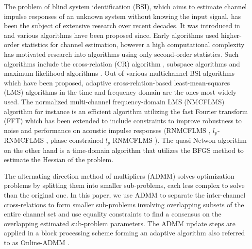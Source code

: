 \documentclass{article}
\begin{document}
The problem of blind system identification (BSI), which aims to estimate channel impulse responses of an unknown system without knowing the input signal, has been the subject of extensive research over recent decades.
It was introduced in \cite{satoMethodSelfRecoveringEqualization1975} and various algorithms have been proposed since.
Early algorithms used higher-order statistics \cite{godardSelfRecoveringEqualizationCarrier1980,tongNewApproachBlind1991,mecidel1991tutorial} for channel estimation, however a high computational complexity has motivated research into algorithms using only second-order statistics.
Such algorithms include the cross-relation (CR) algorithm \cite{tong1994blind, guanghanxuLeastsquaresApproachBlind1995}, subspace algorithms \cite{moulinesSubspaceMethodsBlind1995,gannotSubspaceMethodsMultimicrophone2003,diamantarasEfficientSubspaceMethod2008,mayyalaStructureBasedSubspaceMethod2017} and maximum-likelihood algorithms \cite{yingbohuaFastMaximumLikelihood1996}.
Out of various multichannel BSI algorithms which have been proposed, adaptive cross-relation-based least-mean-squares (LMS) algorithms in the time and frequency domain are the ones most widely used.
The normalized multi-channel frequency-domain LMS (NMCFLMS) \cite{huangAdaptiveMultichannelLeast2002,huangClassFrequencydomainAdaptive2003} algorithm for instance is an efficient algorithm utilizing the fast Fourier transform (FFT) which has been extended to include constraints to improve robustness to noise and performance on acoustic impulse responses (RNMCFLMS \cite{huNoiseRobustBlind2015}, \(l_p\)-RNMCFLMS \cite{heNoiseRobustFrequencyDomain2018}, phase-constrained-\(l_p\)-RNMCFLMS \cite{joRobustBlindMultichannel2021}).
The quasi-Netwon algorithm \cite{habetsOnlineQuasiNewtonAlgorithm2010} on the other hand is a time-domain algorithm that utilizes the BFGS method to estimate the Hessian of the problem.

The alternating direction method of multipliers (ADMM) \cite{boydDistributedOptimizationStatistical2011} solves optimization problems by splitting them into smaller sub-problems, each less complex to solve than the original one.
In this paper, we use ADMM to separate the inter-channel cross-relations to form smaller sub-problems involving overlapping subsets of the entire channel set and use equality constraints to find a consensus on the overlapping estimated sub-problem parameters.
The ADMM update steps are applied in a block processing scheme forming an adaptive algorithm also referred to as Online-ADMM \cite{wangOnlineAlternatingDirection2013,hosseiniOnlineDistributedADMM2014}.
\end{document}
